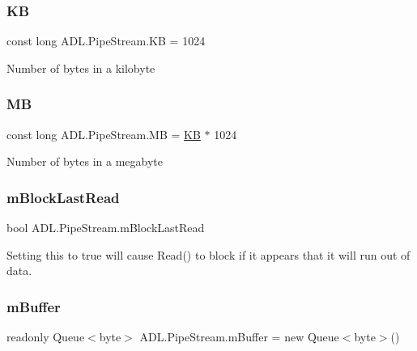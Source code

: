 \subsubsection{\texorpdfstring{KB}{KB}}
{\footnotesize\ttfamily const long A\+D\+L.\+Pipe\+Stream.\+KB = 1024}



Number of bytes in a kilobyte 

\mbox{\label{class_a_d_l_1_1_pipe_stream_ad4a04360b3d017567a0fd48defd434d0}} 
\subsubsection{\texorpdfstring{MB}{MB}}
{\footnotesize\ttfamily const long A\+D\+L.\+Pipe\+Stream.\+MB = \mbox{\hyperlink{class_a_d_l_1_1_pipe_stream_a497552b08f4c042b6a9d2c6be350181e}{KB}} $\ast$ 1024}



Number of bytes in a megabyte 

\mbox{\label{class_a_d_l_1_1_pipe_stream_a1dd964eae6da39ffb26d8bb1ff8ffaa7}} 
\subsubsection{\texorpdfstring{m\+Block\+Last\+Read}{mBlockLastRead}}
{\footnotesize\ttfamily bool A\+D\+L.\+Pipe\+Stream.\+m\+Block\+Last\+Read\hspace{0.3cm}{\ttfamily [private]}}



Setting this to true will cause Read() to block if it appears that it will run out of data. 

\mbox{\label{class_a_d_l_1_1_pipe_stream_ac3ea3e53b1c4a1344a6a9618a67751df}} 
\subsubsection{\texorpdfstring{m\+Buffer}{mBuffer}}
{\footnotesize\ttfamily readonly Queue$<$byte$>$ A\+D\+L.\+Pipe\+Stream.\+m\+Buffer = new Queue$<$byte$>$()\hspace{0.3cm}{\ttfamily [private]}}



